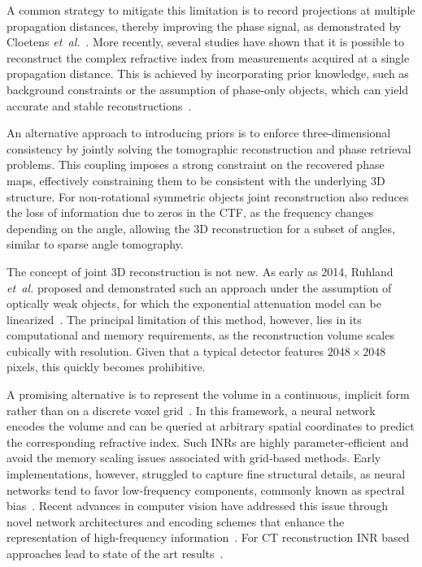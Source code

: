 \documentclass{article}
\begin{document}
A common strategy to mitigate this limitation is to record projections at multiple propagation distances, thereby improving the phase signal, as demonstrated by Cloetens \textit{et~al.}~\cite{cloetensHolotomographyQuantitativePhase1999a}.
More recently, several studies have shown that it is possible to reconstruct the complex refractive index from measurements acquired at a single propagation distance.
This is achieved by incorporating prior knowledge, such as background constraints or the assumption of phase-only objects, which can yield accurate and stable reconstructions~\cite{doraArtifactsuppressingReconstructionStrongly2024,fienupReconstructionSupportObject1982,wittwerPhaseRetrievalFramework2022}.

An alternative approach to introducing priors is to enforce three-dimensional consistency by jointly solving the tomographic reconstruction and phase retrieval problems.
This coupling imposes a strong constraint on the recovered phase maps, effectively constraining them to be consistent with the underlying 3D structure.
For non-rotational symmetric objects joint reconstruction also reduces the loss of information due to zeros in the CTF, as the frequency changes depending on the angle, allowing the 3D reconstruction for a subset of angles, similar to sparse angle tomography.

The concept of joint 3D reconstruction is not new.
As early as 2014, Ruhland \textit{et~al.} proposed and demonstrated such an approach under the assumption of optically weak objects, for which the exponential attenuation model can be linearized~\cite{ruhlandtThreedimensionalPhaseRetrieval2014,ruhlandtThreedimensionalPropagationNearfield2016a}.
The principal limitation of this method, however, lies in its computational and memory requirements, as the reconstruction volume scales cubically with resolution.
Given that a typical detector features $2048 \times 2048$ pixels, this quickly becomes prohibitive.

A promising alternative is to represent the volume in a continuous, implicit form rather than on a discrete voxel grid~\cite{mildenhallNeRFRepresentingScenes2020a}.
In this framework, a neural network encodes the volume and can be queried at arbitrary spatial coordinates to predict the corresponding refractive index.
Such INRs are highly parameter-efficient and avoid the memory scaling issues associated with grid-based methods.
Early implementations, however, struggled to capture fine structural details, as neural networks tend to favor low-frequency components, commonly known as spectral bias~\cite{rahamanSpectralBiasNeural2019}.
Recent advances in computer vision have addressed this issue through novel network architectures and encoding schemes that enhance the representation of high-frequency information~\cite{mildenhallNeRFRepresentingScenes2020a,mullerInstantNeuralGraphics2022}.
For CT reconstruction INR based approaches lead to state of the art results~\cite{essakineWhereWeStand2025,zhaNAFNeuralAttenuation2022a}.
\end{document}
